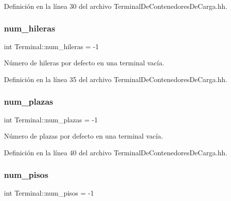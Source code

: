 Definición en la línea 30 del archivo Terminal\+De\+Contenedores\+De\+Carga.\+hh.

\mbox{\label{class_terminal_a865c963b18aa837549dd637d439e8502}} 
\subsubsection{\texorpdfstring{num\+\_\+hileras}{num\_hileras}}
{\footnotesize\ttfamily int Terminal\+::num\+\_\+hileras = -\/1\hspace{0.3cm}{\ttfamily [private]}}



Número de hileras por defecto en una terminal vacía. 



Definición en la línea 35 del archivo Terminal\+De\+Contenedores\+De\+Carga.\+hh.

\mbox{\label{class_terminal_a14265a71722ee28f3a50cee4a72e5607}} 
\subsubsection{\texorpdfstring{num\+\_\+plazas}{num\_plazas}}
{\footnotesize\ttfamily int Terminal\+::num\+\_\+plazas = -\/1\hspace{0.3cm}{\ttfamily [private]}}



Número de plazas por defecto en una terminal vacía. 



Definición en la línea 40 del archivo Terminal\+De\+Contenedores\+De\+Carga.\+hh.

\mbox{\label{class_terminal_ad6cdee7fe26b4443d45b0a18c345a86d}} 
\subsubsection{\texorpdfstring{num\+\_\+pisos}{num\_pisos}}
{\footnotesize\ttfamily int Terminal\+::num\+\_\+pisos = -\/1\hspace{0.3cm}{\ttfamily [private]}}



